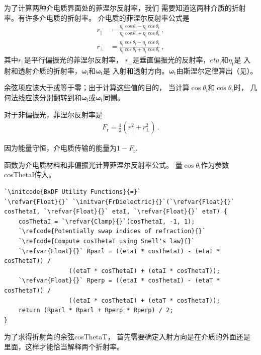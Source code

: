 为了计算两种介电质界面处的菲涅尔反射率，我们
需要知道这两种介质的折射率。有许多介电质的折射率。
介电质的菲涅尔反射率公式是
\begin{align*}
    r_{\parallel} & =\frac{\eta_{\mathrm{t}}\cos\theta_{\mathrm{i}}-\eta_{\mathrm{i}}\cos\theta_{\mathrm{t}}}{\eta_{\mathrm{t}}\cos\theta_{\mathrm{i}}+\eta_{\mathrm{i}}\cos\theta_{\mathrm{t}}}\, , \\
    r_{\perp}     & =\frac{\eta_{\mathrm{i}}\cos\theta_{\mathrm{i}}-\eta_{\mathrm{t}}\cos\theta_{\mathrm{t}}}{\eta_{\mathrm{i}}\cos\theta_{\mathrm{i}}+\eta_{\mathrm{t}}\cos\theta_{\mathrm{t}}}\, ,
\end{align*}
其中$r_{\parallel}$是平行偏振光的菲涅尔反射率，
$r_{\perp}$是垂直偏振光的反射率，$eta_{\mathrm{i}}$和$\eta_{\mathrm{t}}$是
入射和透射介质的折射率，$\bm\omega_{\mathrm{i}}$和$\bm\omega_{\mathrm{t}}$是
入射和透射方向。$\bm\omega_{\mathrm{t}}$由斯涅尔定律算出（见）。

余弦项应该大于或等于零；出于计算这些值的目的，
当计算$\cos\theta_{\mathrm{i}}$和$\cos\theta_{\mathrm{t}}$时，
几何法线应该分别翻转到和$\bm\omega_{\mathrm{i}}$或$\bm\omega_{\mathrm{t}}$同侧。

对于非偏振光，菲涅尔反射率是
\begin{align*}
    F_{\mathrm{r}}=\frac{1}{2}(r_{\parallel}^2+r_{\perp}^2)\, .
\end{align*}

因为能量守恒，介电质传输的能量为$1-F_{\mathrm{r}}$.

函数为介电质材料和非偏振光计算菲涅尔反射率公式。
量$\cos\theta_{\mathrm{i}}$作为参数{\ttfamily cosThetaI}传入。
\begin{lstlisting}
`\initcode{BxDF Utility Functions}{=}`
`\refvar{Float}{}` `\initvar{FrDielectric}{}`(`\refvar{Float}{}` cosThetaI, `\refvar{Float}{}` etaI, `\refvar{Float}{}` etaT) {
    cosThetaI = `\refvar{Clamp}{}`(cosThetaI, -1, 1);
    `\refcode{Potentially swap indices of refraction}{}`
    `\refcode{Compute cosThetaT using Snell's law}{}`
    `\refvar{Float}{}` Rparl = ((etaT * cosThetaI) - (etaI * cosThetaT)) /
                  ((etaT * cosThetaI) + (etaI * cosThetaT));
    `\refvar{Float}{}` Rperp = ((etaI * cosThetaI) - (etaT * cosThetaT)) /
                  ((etaI * cosThetaI) + (etaT * cosThetaT));
    return (Rparl * Rparl + Rperp * Rperp) / 2;
}
\end{lstlisting}

为了求得折射角的余弦{\ttfamily cosThetaT}，
首先需要确定入射方向是在介质的外面还是里面，这样才能恰当解释两个折射率。

